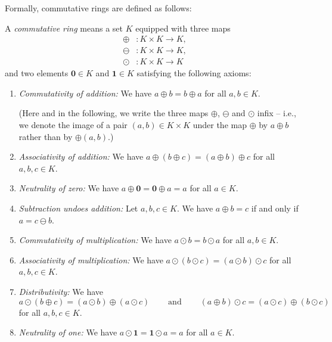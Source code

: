 Formally, commutative rings are defined as follows:

\begin{definition}
\label{def.alg.commring}A \emph{commutative ring} means a set $K$ equipped
with three maps%
\begin{align*}
\oplus &  :K\times K\rightarrow K,\\
\ominus &  :K\times K\rightarrow K,\\
\odot &  :K\times K\rightarrow K
\end{align*}
and two elements $\mathbf{0}\in K$ and $\mathbf{1}\in K$ satisfying the
following axioms:

\begin{enumerate}
\item \emph{Commutativity of addition:} We have $a\oplus b=b\oplus a$ for all
$a,b\in K$.

(Here and in the following, we write the three maps $\oplus$, $\ominus$ and
$\odot$ infix -- i.e., we denote the image of a pair $\left(  a,b\right)  \in
K\times K$ under the map $\oplus$ by $a\oplus b$ rather than by $\oplus\left(
a,b\right)  $.)

\item \emph{Associativity of addition:} We have $a\oplus\left(  b\oplus
c\right)  =\left(  a\oplus b\right)  \oplus c$ for all $a,b,c\in K$.

\item \emph{Neutrality of zero:} We have $a\oplus\mathbf{0}=\mathbf{0}\oplus
a=a$ for all $a\in K$.

\item \emph{Subtraction undoes addition:} Let $a,b,c\in K$. We have $a\oplus
b=c$ if and only if $a=c\ominus b$.

\item \emph{Commutativity of multiplication:} We have $a\odot b=b\odot a$ for
all $a,b\in K$.

\item \emph{Associativity of multiplication:} We have $a\odot\left(  b\odot
c\right)  =\left(  a\odot b\right)  \odot c$ for all $a,b,c\in K$.

\item \emph{Distributivity:} We have%
\[
a\odot\left(  b\oplus c\right)  =\left(  a\odot b\right)  \oplus\left(  a\odot
c\right)  \ \ \ \ \ \ \ \ \ \ \text{and}\ \ \ \ \ \ \ \ \ \ \left(  a\oplus
b\right)  \odot c=\left(  a\odot c\right)  \oplus\left(  b\odot c\right)
\]
for all $a,b,c\in K$.

\item \emph{Neutrality of one:} We have $a\odot\mathbf{1}=\mathbf{1}\odot a=a$
for all $a\in K$.


\end{enumerate}
\end{definition}
